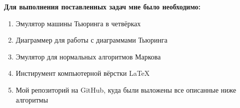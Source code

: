 \documentclass{article}
\begin{document}
\begin{center}
    \textbf{Для выполнения поставленных задач мне было необходимо:}\\
    \begin{enumerate} 
    \item Эмулятор машины Тьюринга в четвёрках
    \item Диаграммер для работы с диаграммами Тьюринга
    \item Эмулятор для нормальных алгоритмов Маркова 
    \item Инстирумент компьютерной вёрстки LaTeX
    \item Мой репозиторий на GitHub, куда были выложены все описанные ниже алгоритмы
    \end{enumerate}
\end{center}

\vspace{10cm}
\end{document}
